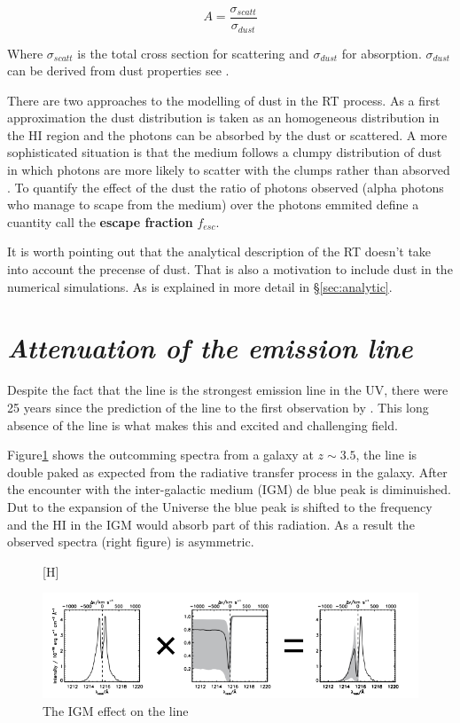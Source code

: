 \begin{equation}
A = \dfrac{\sigma_{scatt}}{\sigma_{dust}}
\end{equation}

Where $\sigma_{scatt}$ is the total cross section for scattering 
and $\sigma_{dust}$ for absorption. $\sigma_{dust}$ can be derived from 
dust properties see \citep{Laursen09}. 

There are two approaches to the modelling of dust in the \ly RT process.
As a first approximation the dust distribution is taken as an homogeneous distribution 
in the HI region and 
the \ly photons can be absorbed by the dust or scattered. A more
sophisticated situation is that the medium follows a clumpy distribution
of dust in which \ly photons are more likely to scatter with the 
clumps rather than absorved \citep{Laursen13}. To quantify the effect of 
the dust the ratio
of \ly photons observed (\ly alpha photons who manage to scape from the medium) 
over the \ly photons emmited define a cuantity call the {\bf{escape fraction}} $f_{esc}$. 

It is worth pointing out that the analytical
description of the \ly RT doesn't take into account the precense of
dust. That is also a motivation to include dust in the numerical simulations.
As is explained in more detail in \S \ref{sec:analytic}.  





\section{\emph{Attenuation of the \ly emission line}}

Despite the fact that the \ly line is the strongest emission line in 
the UV, there were 25 years since the prediction of the \ly line to 
the first observation by \citep{DjorgovskiThomson92}. 
This long absence of the \ly line is what makes this and excited and 
challenging field.

Figure\ref{fig:IGM} shows the outcomming spectra from a galaxy 
at $z \sim 3.5$, the line is double paked as expected from 
the radiative transfer process in the galaxy. After the encounter
with the inter-galactic medium (IGM) de blue peak is diminuished.
Dut to the expansion of the Universe the blue peak 
is shifted to the \ly frequency and the HI in the IGM would absorb
part of this radiation. As a result the observed spectra (right figure)
is asymmetric.   

\begin{figure}\label{fig:IGM}[H]
\begin{center}
\includegraphics[scale=0.6]{../Figures/ISM.png}
\end{center}\caption{The IGM effect on the \ly line}
\end{figure}


